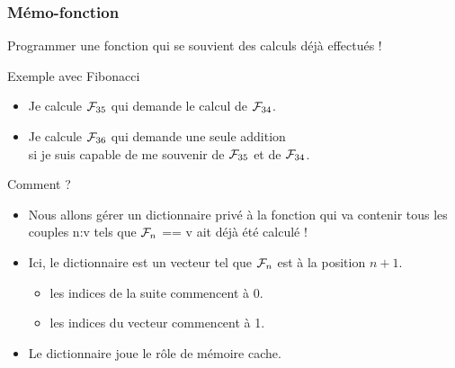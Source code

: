 \documentclass[10pt]{beamer}
\newcommand{\F}[1]{\ensuremath{{\cal F}_{#1}}\xspace}
\begin{document}
\begin{frame}
  \frametitle{Mémo-fonction}
  \alert{Programmer une fonction qui se souvient des calculs déjà effectués !}

  \begin{exampleblock}{Exemple avec Fibonacci}
    \begin{itemize}
    \item Je calcule \F{35} qui demande le calcul de \F{34}.
    \item Je calcule \F{36} qui demande une seule addition \\si je suis capable de me souvenir de \F{35} et de \F{34}.   
    \end{itemize}
  \end{exampleblock}

  \begin{block}{Comment ?}
    \begin{itemize}
    \item Nous allons gérer un dictionnaire privé à la fonction qui va contenir tous les couples n:v tels que \F{n} == v ait déjà été calculé !
    \item Ici, le dictionnaire est un vecteur tel que \F{n} est à la position $n+1$.
      \begin{itemize}
      \item les indices de la suite commencent à 0.
      \item les indices du vecteur commencent à 1.
      \end{itemize}
    \item<alert@1> Le dictionnaire joue le rôle de mémoire cache.
    \end{itemize}
\end{block}



\end{frame}
\end{document}
